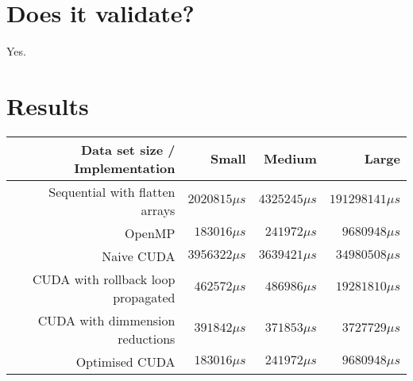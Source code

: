 \documentclass[]{report}
\begin{document}
\chapter{Does it validate?}
Yes.
\chapter{Results}
\begin{tabular}{|r|r|r|r|}
  \hline
  Data set size / Implementation & Small & Medium & Large\\
  \hline
  Sequential with flatten arrays & $2020815 \mu s$ & $4325245 \mu s$ & $191298141 \mu s$ \\
 \hline
 OpenMP & $183016 \mu s$ & $241972 \mu s$ & $9680948 \mu s$\\
  \hline
 Naive CUDA & $3956322 \mu s$ & $3639421 \mu s$ & $34980508 \mu s$\\
  \hline
 CUDA with rollback loop propagated & $462572 \mu s$ & $486986 \mu s$ & $19281810 \mu s$\\
  \hline
 CUDA with dimmension reductions & $391842 \mu s$ & $371853 \mu s$ & $3727729 \mu s$\\
  \hline
 Optimised CUDA & $183016 \mu s$ & $241972 \mu s$ & $9680948 \mu s$\\
  \hline
\end{tabular}
\end{document}
